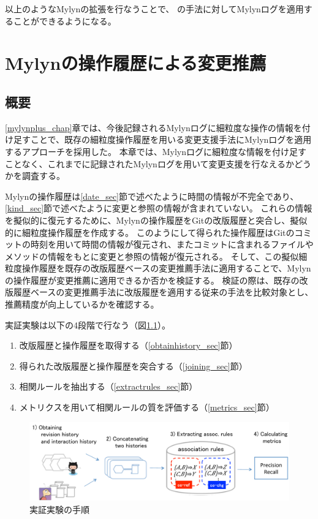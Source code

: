 \documentclass[a4paper]{jsbook}
\begin{document}
以上のようなMylynの拡張を行なうことで、
\cite{6233415,KatoJapanese:2011,ss2012-76,ss2013-84,Yamamori:2016}の手法に対してMylynログを適用することができるようになる。

\chapter{Mylynの操作履歴による変更推薦}\label{experiment_chap}
\section{概要}
\ref{mylynplus_chap}章では、今後記録されるMylynログに細粒度な操作の情報を付け足すことで、既存の細粒度操作履歴を用いる変更支援手法にMylynログを適用するアプローチを採用した。
本章では、Mylynログに細粒度な情報を付け足すことなく、これまでに記録されたMylynログを用いて変更支援を行なえるかどうかを調査する。

Mylynの操作履歴は\ref{date_sec}節で述べたように時間の情報が不完全であり、\ref{kind_sec}節で述べたように変更と参照の情報が含まれていない。
これらの情報を擬似的に復元するために、Mylynの操作履歴をGitの改版履歴と突合し、擬似的に細粒度操作履歴を作成する。
このようにして得られた操作履歴はGitのコミットの時刻を用いて時間の情報が復元され、またコミットに含まれるファイルやメソッドの情報をもとに変更と参照の情報が復元される。
そして、この擬似細粒度操作履歴を既存の改版履歴ベースの変更推薦手法に適用することで、Mylynの操作履歴が変更推薦に適用できるか否かを検証する。
検証の際は、既存の改版履歴ベースの変更推薦手法に改版履歴を適用する従来の手法を比較対象とし、推薦精度が向上しているかを確認する。

実証実験は以下の4段階で行なう（図\ref{procedure}）。
\begin{enumerate}
  \item 改版履歴と操作履歴を取得する（\ref{obtainhistory_sec}節）
  \item 得られた改版履歴と操作履歴を突合する（\ref{joining_sec}節）
  \item 相関ルールを抽出する（\ref{extractrules_sec}節）
  \item メトリクスを用いて相関ルールの質を評価する（\ref{metrics_sec}節）
\end{enumerate}
\begin{figure}[tb]
  \centering
  \includegraphics[width = \linewidth]{resource/procedure.pdf}
  \caption{実証実験の手順}
  \label{procedure}
\end{figure}
\end{document}
